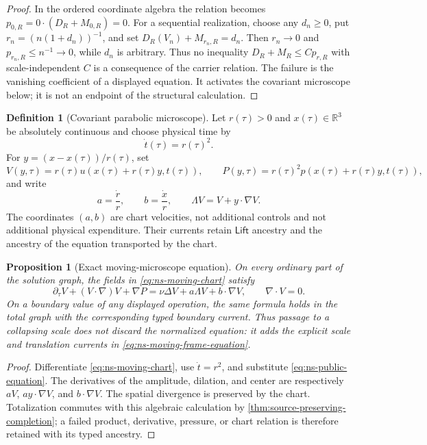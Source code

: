 \documentclass[11pt]{article}
\numberwithin{section}{part}
\theoremstyle{plain}
\newtheorem{proposition}[proposition]{Proposition}
\theoremstyle{definition}
\newtheorem{definition}[definition]{Definition}
\theoremstyle{remark}
\newcommand{\Lift}{\mathsf{Lift}}
\begin{document}
\begin{proof}
In the ordered coordinate algebra the relation becomes
\(p_{0,R}=0\cdot(D_R+M_{0,R})=0\).  For a sequential realization, choose any
\(d_n\ge0\), put \(r_n=(n(1+d_n))^{-1}\), and set
\(D_R(V_n)+M_{r_n,R}=d_n\).  Then
\(r_n\to0\) and \(p_{r_n,R}\le n^{-1}\to0\), while \(d_n\) is arbitrary.
Thus no inequality \(D_R+M_R\le C p_{r,R}\) with scale-independent \(C\)
is a consequence of the carrier relation.  The failure is the vanishing
coefficient of a displayed equation.  It activates the covariant microscope
below; it is not an endpoint of the structural calculation.
\end{proof}

\begin{definition}[Covariant parabolic microscope]
\label{def:ns-covariant-microscope}
Let \(r(\tau)>0\) and \(x(\tau)\in\mathbb R^3\) be absolutely continuous and
choose physical time by
\[
 \dot t(\tau)=r(\tau)^2.
\]
For \(y=(x-x(\tau))/r(\tau)\), set
\begin{equation}
 \label{eq:ns-moving-chart}
 V(y,\tau)=r(\tau)u(x(\tau)+r(\tau)y,t(\tau)),
 \qquad
 P(y,\tau)=r(\tau)^2p(x(\tau)+r(\tau)y,t(\tau)),
\end{equation}
and write
\[
 a=\frac{\dot r}{r},\qquad b=\frac{\dot x}{r},\qquad
 \Lambda V=V+y\cdot\nabla V.
\]
The coordinates \((a,b)\) are chart velocities, not additional controls and
not additional physical expenditure.  Their currents retain \(\Lift\)
ancestry and the ancestry of the equation transported by the chart.
\end{definition}

\begin{proposition}[Exact moving-microscope equation]
\label{prop:ns-moving-microscope-equation}
On every ordinary part of the solution graph, the fields in
\eqref{eq:ns-moving-chart} satisfy
\begin{equation}
 \label{eq:ns-moving-frame-equation}
 \partial_\tau V+(V\cdot\nabla)V+\nabla P
 =\nu\Delta V+a\Lambda V+b\cdot\nabla V,
 \qquad \nabla\cdot V=0.
\end{equation}
On a boundary value of any displayed operation, the same formula holds in
the total graph with the corresponding typed boundary current.  Thus passage
to a collapsing scale does not discard the normalized equation: it adds the
explicit scale and translation currents in \eqref{eq:ns-moving-frame-equation}.
\end{proposition}

\begin{proof}
Differentiate \eqref{eq:ns-moving-chart}, use \(\dot t=r^2\), and substitute
\eqref{eq:ns-public-equation}.  The derivatives of the amplitude, dilation,
and center are respectively \(aV\), \(ay\cdot\nabla V\), and
\(b\cdot\nabla V\).  The spatial divergence is preserved by the chart.
Totalization commutes with this algebraic calculation by
\cref{thm:source-preserving-completion}; a failed product, derivative,
pressure, or chart relation is therefore retained with its typed ancestry.
\end{proof}
\end{document}
